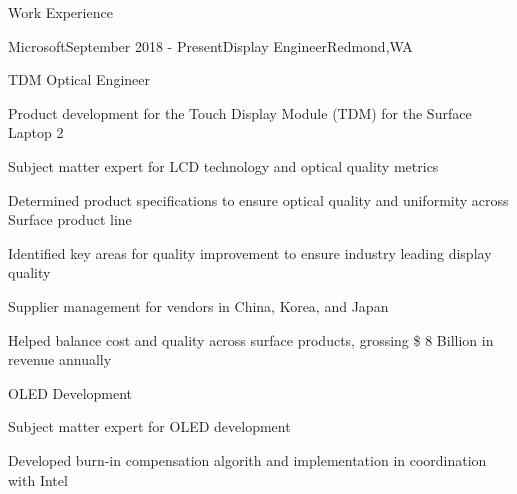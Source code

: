 \documentclass{resume} %
\begin{document}

\begin{rSection}{Work Experience}

\begin{rSubsection}{Microsoft}{September 2018 - Present}{Display Engineer}{Redmond,WA}
\begin{rSubsubsection}{TDM Optical Engineer}
\item Product development for the Touch Display Module (TDM) for the Surface Laptop 2 
\item Subject matter expert for LCD technology and optical quality metrics
\item Determined product specifications to ensure optical quality and uniformity across Surface product line
\item Identified key areas for quality improvement to ensure industry leading display quality
\item Supplier management for vendors in China, Korea, and Japan
\item Helped balance cost and quality across surface products, grossing \$ 8 Billion in revenue annually
\end{rSubsubsection}
\begin{rSubsubsection}{OLED Development}
\item Subject matter expert for OLED development
\item Developed burn-in compensation algorith and implementation in coordination with Intel
\end{rSubsubsection}
\end{rSubsection}
\end{rSection}
\end{document}
